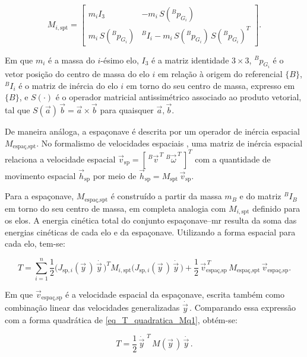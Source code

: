 \begin{equation}
M_{i,\text{spt}}
=
\begin{bmatrix}
m_i I_3 & -m_i\,S({}^{B}\!p_{G_i})\\[2pt]
m_i\,S({}^{B}\!p_{G_i}) &
{}^{B}\!I_i - m_i\,S({}^{B}\!p_{G_i})\,S({}^{B}\!p_{G_i})^{T}
\end{bmatrix}.
\end{equation}

Em que $m_i$ é a massa do $i$-ésimo elo, $I_3$ é a matriz identidade $3\times 3$,
${}^{B}\!p_{G_i}$ é o vetor posição do centro de massa do elo $i$
em relação à origem do referencial $\{B\}$, ${}^{B}\!I_i$
é o matriz de inércia do elo $i$ em torno do seu centro de massa, expresso em
$\{B\}$, e $S(\cdot)$ é o operador matricial antissimétrico associado ao produto
vetorial, tal que $S(\vec a)\,\vec b = \vec a \times \vec b$ para quaisquer
$\vec a,\vec b$.

De maneira análoga, a espaçonave é descrita por um operador de inércia
espacial $M_{\text{espaç},\text{spt}}$.
No formalismo de velocidades espaciais \cite{featherstone2008}, uma matriz de
inércia espacial relaciona a velocidade espacial
$\vec v_{\text{sp}} = [\,{}^{B}\!\vec v^{\,T}\;{}^{B}\!\vec\omega^{\,T}\,]^{T}$
com a quantidade de movimento espacial
$\vec h_{\text{sp}}$ por meio de
$\vec h_{\text{sp}} = M_{\text{spt}}\,\vec v_{\text{sp}}$.

Para a espaçonave, $M_{\text{espaç},\text{spt}}$ é construído a partir da massa
$m_B$ e do matriz ${}^{B}\!I_B$ em torno do seu centro de massa, em completa
analogia com $M_{i,\text{spt}}$ definido para os elos.
A energia cinética total do conjunto espaçonave--\gls{mr} resulta da soma das
energias cinéticas de cada elo e da espaçonave.
Utilizando a forma espacial para cada elo, tem-se:

\begin{equation}
T
=
\sum_{i=1}^{n}
\frac{1}{2}
\bigl(J_{\text{sp},i}(\vec y\, )\,\dot{\vec y\, }\bigr)^{T}
M_{i,\text{spt}}
\bigl(J_{\text{sp},i}(\vec y\, )\,\dot{\vec y\, }\bigr)
+
\frac{1}{2}\,
\vec v_{\text{espaç,sp}}^{\,T}\,
M_{\text{espaç},\text{spt}}\,
\vec v_{\text{espaç,sp}}.
\end{equation}

Em que $\vec v_{\text{espaç,sp}}$ é a velocidade espacial da espaçonave, escrita
também como combinação linear das velocidades generalizadas $\dot{\vec y\, }$.
Comparando essa expressão com a forma quadrática de \eqref{eq_T_quadratica_Mq1}, obtém-se:

\begin{equation}
T =
\frac{1}{2}\,\dot{\vec y\, }^{\,T}\,M(\vec y\, )\,\dot{\vec y\, }.
\end{equation}

